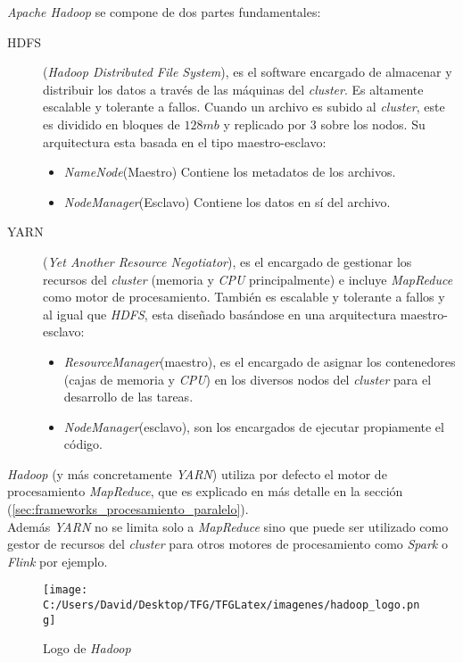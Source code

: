 \noindent \textit{Apache Hadoop} se compone de dos partes fundamentales:
\begin{description}
  \item[HDFS](\textit{Hadoop Distributed File System}), es el software encargado de almacenar 
  y distribuir los datos a través de las máquinas del \textit{cluster}. Es altamente escalable y tolerante a fallos.
  Cuando un archivo es subido al \textit{cluster}, este es dividido en bloques de $128 mb$ y replicado por
  3 sobre los nodos.
  Su arquitectura esta basada en el tipo maestro-esclavo:
  \begin{itemize}
    \item \textit{NameNode}(Maestro) Contiene los metadatos de los archivos.
    \item \textit{NodeManager}(Esclavo) Contiene los datos en sí del archivo.
  \end{itemize}

  \item[YARN] (\textit{Yet Another Resource Negotiator}), es el encargado de gestionar 
  los recursos del \textit{cluster} (memoria y \textit{CPU} principalmente) e incluye \textit{MapReduce} 
  como motor de procesamiento. También es escalable y tolerante a fallos y al igual que \textit{HDFS}, 
  esta diseñado basándose en una arquitectura maestro-esclavo:
  \begin{itemize}
    \item \textit{ResourceManager}(maestro), es el encargado de asignar los contenedores (cajas de
    memoria y \textit{CPU}) en los diversos nodos del \textit{cluster} para el desarrollo de las tareas.
    \item \textit{NodeManager}(esclavo), son los encargados de ejecutar propiamente el código.
  \end{itemize}
\end{description}

\noindent \textit{Hadoop} (y más concretamente \textit{YARN}) utiliza por defecto el motor de procesamiento \textit{MapReduce},
que es explicado en más detalle en la sección  
  (\autoref{sec:frameworks_procesamiento_paralelo}). \\
Además \textit{YARN} no se limita solo a \textit{MapReduce} sino que puede ser utilizado como gestor de recursos
del \textit{cluster} para otros motores de procesamiento como \textit{Spark} o \textit{Flink} por ejemplo.

\begin{figure}[!htpb]
  \centering
  \texttt{[image: C:/Users/David/Desktop/TFG/TFGLatex/imagenes/hadoop\_logo.png]}
  \caption[Logo de \textit{Hadoop}]{Logo de \textit{Hadoop}}
  \label{hadoop_logo}
\end{figure}

